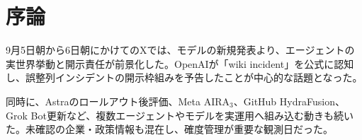 \section{序論}
9月5日朝から6日朝にかけてのXでは、モデルの新規発表より、エージェントの実世界挙動と開示責任が前景化した。OpenAIが「wiki incident」を公式に認知し、誤整列インシデントの開示枠組みを予告したことが中心的な話題となった。

同時に、Astraのロールアウト後評価、Meta AIRA$_3$、GitHub HydraFusion、Grok Bot更新など、複数エージェントやモデルを実運用へ組み込む動きも続いた。未確認の企業・政策情報も混在し、確度管理が重要な観測日だった。